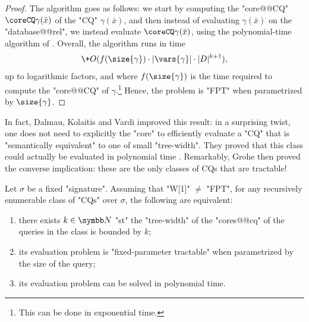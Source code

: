 \begin{proof}
	The algorithm goes as follows:
	we start by computing the "core@@CQ" $\coreCQ\gamma(\bar x)$
	of the "CQ" $\gamma(\bar x)$, and then instead of evaluating
	$\gamma(\bar x)$ on the "database@@rel", we instead evaluate
	$\coreCQ\gamma(\bar x)$, using the polynomial-time algorithm
	of .
	Overall, the algorithm runs in time
	\[
		\+O(f(\size{\gamma})\cdot|\vars{\gamma}|\cdot |D|^{k+1}),
	\]
	up to logarithmic factors, and where $f(\size{\gamma})$
	is the time required to compute the "core@@CQ" of
	$\gamma$.\footnote{This can be done in exponential time.}
	Hence, the problem is "FPT" when parametrized by $\size{\gamma}$.
\end{proof}

In fact, Dalmau, Kolaitis and Vardi improved this result: in a surprising twist, 
one does not need to explicitly the "core" to efficiently evaluate
a "CQ" that is "semantically equivalent" to one of small "tree-width".
They proved that this class could actually be evaluated in polynomial time
\cite[Corollary~5]{DalmauKolaitisVardi2002Constraint}.
Remarkably, Grohe then proved the converse implication: these 
are the only classes of CQs that are tractable!
\begin{proposition}
	Let $\sigma$ be a fixed "signature".
	Assuming that "W[1]" $\neq$ "FPT", for any recursively enumerable
	class of "CQs" over $\sigma$, the following are equivalent:
	\begin{enumerate}
		\item there exists $k\in\N$ "st" the "tree-width" of the "cores@@cq"
			of the queries in the class is bounded by $k$;
		\item its evaluation problem is "fixed-parameter tractable"
			when parametrized by the size of the query;
		\item its evaluation problem can be solved in polynomial time.
	\end{enumerate}
\end{proposition}

